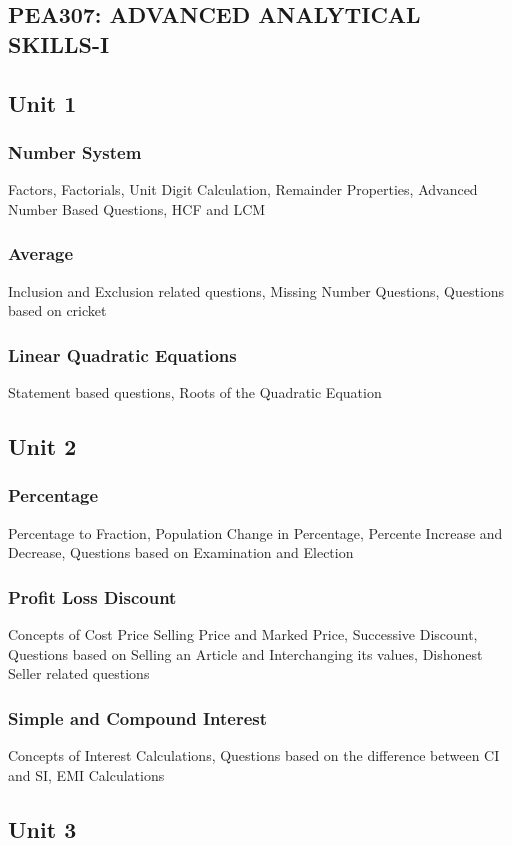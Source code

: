 \documentclass{article}
\begin{document}
\begin{multicols*}{2}
    \section*{PEA307: ADVANCED ANALYTICAL SKILLS-I}
    \subsection*{Unit 1}
    \subsubsection*{Number System}
    Factors, Factorials, Unit Digit Calculation, Remainder Properties, Advanced Number Based Questions, HCF and LCM
    \subsubsection*{Average}
    Inclusion and Exclusion related questions, Missing Number Questions, Questions based on cricket
    \subsubsection*{Linear Quadratic Equations}
    Statement based questions, Roots of the Quadratic Equation
    \subsection*{Unit 2}
    \subsubsection*{Percentage}
    Percentage to Fraction, Population Change in Percentage, Percente Increase and Decrease, Questions based on Examination and Election
    \subsubsection*{Profit Loss Discount}
    Concepts of Cost Price Selling Price and Marked Price, Successive Discount, Questions based on Selling an Article and Interchanging its values, Dishonest Seller related questions
    \subsubsection*{Simple and Compound Interest}
    Concepts of Interest Calculations, Questions based on the difference between CI and SI, EMI Calculations
    \subsection*{Unit 3}

\end{multicols*}
\end{document}
